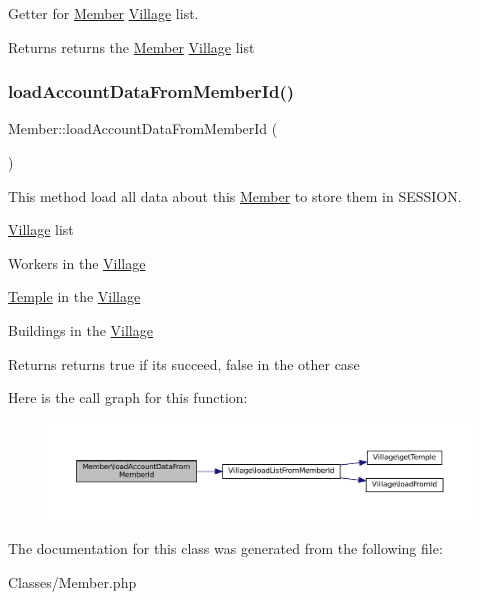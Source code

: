 Getter for \mbox{\hyperlink{classMember}{Member}} \mbox{\hyperlink{classVillage}{Village}} list. 

\begin{DoxyReturn}{Returns}
returns the \mbox{\hyperlink{classMember}{Member}} \mbox{\hyperlink{classVillage}{Village}} list 
\end{DoxyReturn}
\mbox{\label{classMember_a9624c3631bc10fbc592380353e537928}} 
\subsubsection{\texorpdfstring{load\+Account\+Data\+From\+Member\+Id()}{loadAccountDataFromMemberId()}}
{\footnotesize\ttfamily Member\+::load\+Account\+Data\+From\+Member\+Id (\begin{DoxyParamCaption}{ }\end{DoxyParamCaption})}



This method load all data about this \mbox{\hyperlink{classMember}{Member}} to store them in S\+E\+S\+S\+I\+ON. 


\begin{DoxyItemize}
\item \mbox{\hyperlink{classVillage}{Village}} list
\begin{DoxyItemize}
\item Workers in the \mbox{\hyperlink{classVillage}{Village}}
\item \mbox{\hyperlink{classTemple}{Temple}} in the \mbox{\hyperlink{classVillage}{Village}}
\item Buildings in the \mbox{\hyperlink{classVillage}{Village}} \begin{DoxyReturn}{Returns}
returns true if it\textquotesingle{}s succeed, false in the other case 
\end{DoxyReturn}

\end{DoxyItemize}
\end{DoxyItemize}Here is the call graph for this function\+:
\nopagebreak
\begin{figure}[H]
\begin{center}
\leavevmode
\includegraphics[width=350pt]{classMember_a9624c3631bc10fbc592380353e537928_cgraph}
\end{center}
\end{figure}


The documentation for this class was generated from the following file\+:\begin{DoxyCompactItemize}
\item 
Classes/Member.\+php\end{DoxyCompactItemize}
